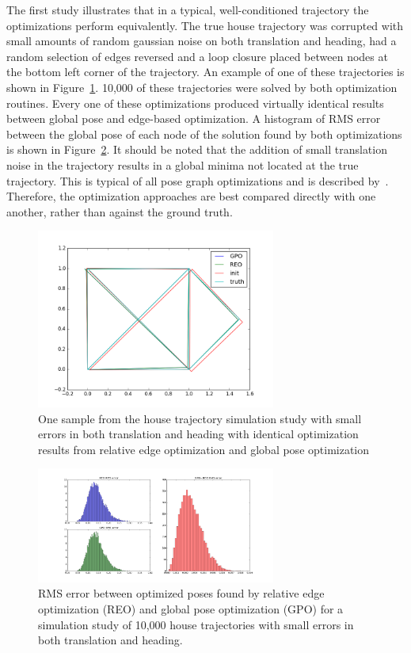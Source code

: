 The first study illustrates that in a typical, well-conditioned trajectory the optimizations perform equivalently.  The true house trajectory was corrupted with small amounts of random gaussian noise on both translation and heading, had a random selection of edges reversed and a loop closure placed between nodes at the bottom left corner of the trajectory.  An example of one of these trajectories is shown in Figure~\ref{fig:house_trajectory}. 10,000 of these trajectories were solved by both optimization routines.  Every one of these optimizations produced virtually identical results between global pose and edge-based optimization.  A histogram of RMS error between the global pose of each node of the solution found by both optimizations is shown in Figure~\ref{fig:convergence_house}.  It should be noted that the addition of small translation noise in the trajectory results in a global minima not located at the true trajectory.  This is typical of all pose graph optimizations and is described by~\cite{POSE_GRAPH_ERROR}.  Therefore, the optimization approaches are best compared directly with one another, rather than against the ground truth.

\begin{figure}
  \includegraphics[width=0.7\textwidth]{figures/house_trajectory.png}
  \caption{One sample from the house trajectory simulation study with small errors in both translation and heading with identical optimization results from relative edge optimization and global pose optimization}
  \label{fig:house_trajectory}
\end{figure}

\begin{figure}[H]
  \includegraphics[width=0.7\textwidth]{figures/REO_vs_GPO_good.png}
  \caption{RMS error between optimized poses found by relative edge optimization (REO) and global pose optimization (GPO) for a simulation study of 10,000 house trajectories with small errors in both translation and heading.}
  \label{fig:convergence_house}
\end{figure}

